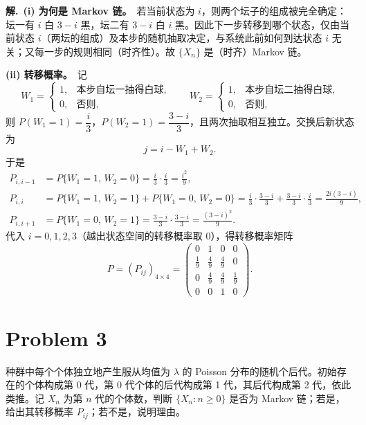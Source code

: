 \documentclass[12pt,a4paper]{article}
\begin{document}
\begin{answerbox}
\textbf{解.}\ \textbf{(i) 为何是 Markov 链。}\ 若当前状态为 $i$，则两个坛子的组成被完全确定：坛一有 $i$ 白 $3-i$ 黑，坛二有 $3-i$ 白 $i$ 黑。因此下一步转移到哪个状态，仅由当前状态 $i$（两坛的组成）及本步的随机抽取决定，与系统此前如何到达状态 $i$ 无关；又每一步的规则相同（时齐性）。故 $\{X_n\}$ 是（时齐）Markov 链。

\textbf{(ii) 转移概率。}\ 记
\[
W_1=\begin{cases}1, & \text{本步自坛一抽得白球},\\ 0, & \text{否则},\end{cases}
\qquad
W_2=\begin{cases}1, & \text{本步自坛二抽得白球},\\ 0, & \text{否则},\end{cases}
\]
则 $P(W_1=1)=\dfrac{i}{3}$，$P(W_2=1)=\dfrac{3-i}{3}$，且两次抽取相互独立。交换后新状态为
\[
j = i-W_1+W_2 .
\]
于是
\begin{align*}
P_{i,i-1} &= P\{W_1=1,\,W_2=0\} = \frac{i}{3}\cdot\frac{i}{3} = \frac{i^2}{9},\\[2pt]
P_{i,i}   &= P\{W_1=1,\,W_2=1\}+P\{W_1=0,\,W_2=0\}
           = \frac{i}{3}\cdot\frac{3-i}{3}+\frac{3-i}{3}\cdot\frac{i}{3} = \frac{2i(3-i)}{9},\\[2pt]
P_{i,i+1} &= P\{W_1=0,\,W_2=1\} = \frac{3-i}{3}\cdot\frac{3-i}{3} = \frac{(3-i)^2}{9}.
\end{align*}
代入 $i=0,1,2,3$（越出状态空间的转移概率取 $0$），得转移概率矩阵
\[
P=(P_{ij})_{4\times 4}
=\begin{pmatrix}
0 & 1 & 0 & 0\\[3pt]
\frac19 & \frac49 & \frac49 & 0\\[3pt]
0 & \frac49 & \frac49 & \frac19\\[3pt]
0 & 0 & 1 & 0
\end{pmatrix}.
\]
\end{answerbox}

\section{Problem 3}

种群中每个个体独立地产生服从均值为 $\lambda$ 的 Poisson 分布的随机个后代。初始存在的个体构成第 0 代，第 0 代个体的后代构成第 1 代，其后代构成第 2 代，依此类推。记 $X_n$ 为第 $n$ 代的个体数，判断 $\{X_n : n\ge 0\}$ 是否为 Markov 链；若是，给出其转移概率 $P_{ij}$；若不是，说明理由。
\end{document}

